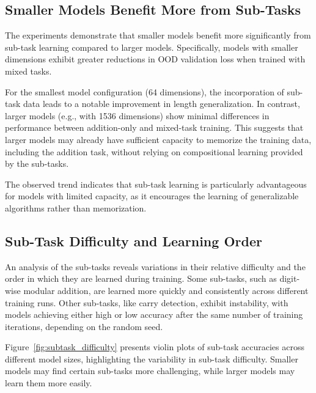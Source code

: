 \subsection{Smaller Models Benefit More from Sub-Tasks}

The experiments demonstrate that smaller models benefit more significantly from sub-task learning compared to larger models. Specifically, models with smaller dimensions exhibit greater reductions in OOD validation loss when trained with mixed tasks.

For the smallest model configuration (64 dimensions), the incorporation of sub-task data leads to a notable improvement in length generalization. In contrast, larger models (e.g., with 1536 dimensions) show minimal differences in performance between addition-only and mixed-task training. This suggests that larger models may already have sufficient capacity to memorize the training data, including the addition task, without relying on compositional learning provided by the sub-tasks.

The observed trend indicates that sub-task learning is particularly advantageous for models with limited capacity, as it encourages the learning of generalizable algorithms rather than memorization.


\subsection{Sub-Task Difficulty and Learning Order}

An analysis of the sub-tasks reveals variations in their relative difficulty and the order in which they are learned during training. Some sub-tasks, such as digit-wise modular addition, are learned more quickly and consistently across different training runs. Other sub-tasks, like carry detection, exhibit instability, with models achieving either high or low accuracy after the same number of training iterations, depending on the random seed.

Figure~\ref{fig:subtask_difficulty} presents violin plots of sub-task accuracies across different model sizes, highlighting the variability in sub-task difficulty. Smaller models may find certain sub-tasks more challenging, while larger models may learn them more easily.

